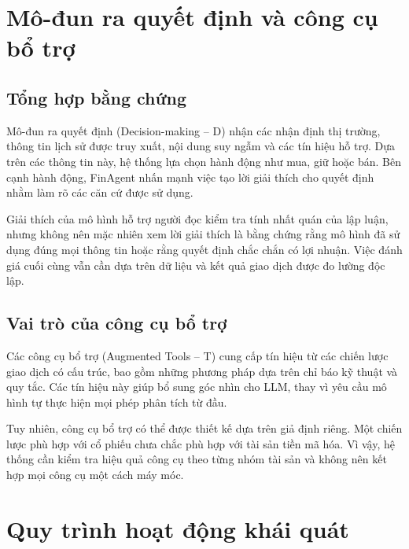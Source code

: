 \section{Mô-đun ra quyết định và công cụ bổ trợ}

\subsection{Tổng hợp bằng chứng}
Mô-đun ra quyết định (Decision-making -- D) nhận các nhận định thị trường, thông tin lịch sử được truy xuất, nội dung suy ngẫm và các tín hiệu hỗ trợ. Dựa trên các thông tin này, hệ thống lựa chọn hành động như mua, giữ hoặc bán. Bên cạnh hành động, FinAgent nhấn mạnh việc tạo lời giải thích cho quyết định nhằm làm rõ các căn cứ được sử dụng.

Giải thích của mô hình hỗ trợ người đọc kiểm tra tính nhất quán của lập luận, nhưng không nên mặc nhiên xem lời giải thích là bằng chứng rằng mô hình đã sử dụng đúng mọi thông tin hoặc rằng quyết định chắc chắn có lợi nhuận. Việc đánh giá cuối cùng vẫn cần dựa trên dữ liệu và kết quả giao dịch được đo lường độc lập.

\subsection{Vai trò của công cụ bổ trợ}
Các công cụ bổ trợ (Augmented Tools -- T) cung cấp tín hiệu từ các chiến lược giao dịch có cấu trúc, bao gồm những phương pháp dựa trên chỉ báo kỹ thuật và quy tắc. Các tín hiệu này giúp bổ sung góc nhìn cho LLM, thay vì yêu cầu mô hình tự thực hiện mọi phép phân tích từ đầu.

Tuy nhiên, công cụ bổ trợ có thể được thiết kế dựa trên giả định riêng. Một chiến lược phù hợp với cổ phiếu chưa chắc phù hợp với tài sản tiền mã hóa. Vì vậy, hệ thống cần kiểm tra hiệu quả công cụ theo từng nhóm tài sản và không nên kết hợp mọi công cụ một cách máy móc.

\section{Quy trình hoạt động khái quát}

